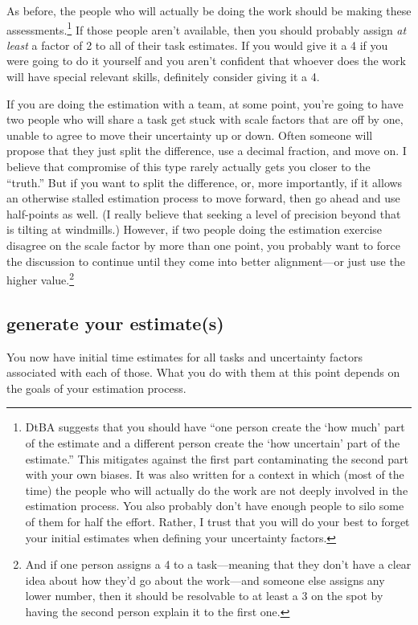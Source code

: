 \documentclass[12pt,oneside]{book}
\begin{document}
As before, the people who will actually be doing the work should be making these assessments.\footnote{
DtBA suggests that you should have ``one person create the `how much' part of the estimate and a different person create the `how uncertain' part of the estimate.'' This mitigates against the first part contaminating the second part with your own biases. It was also written for a context in which (most of the time) the people who will actually do the work are not deeply involved in the estimation process. You also probably don't have enough people to silo some of them for half the effort. Rather, I trust that you will do your best to forget your initial estimates when defining your uncertainty factors.}
If those people aren't available, then you should probably assign \emph{at least} a factor of 2 to all of their task estimates. If you would give it a 4 if you were going to do it yourself and you aren't confident that whoever does the work will have special relevant skills, definitely consider giving it a 4.

If you are doing the estimation with a team, at some point, you're going to have two people who will share a task get stuck with scale factors that are off by one, unable to agree to move their uncertainty up or down. Often someone will propose that they just split the difference, use a decimal fraction, and move on. I believe that compromise of this type rarely actually gets you closer to the ``truth.'' But if you want to split the difference, or, more importantly, if it allows an otherwise stalled estimation process to move forward, then go ahead and use half-points as well. (I really believe that seeking a level of precision beyond that is tilting at windmills.) However, if two people doing the estimation exercise disagree on the scale factor by more than one point, you probably want to force the discussion to continue until they come into better alignment---or just use the higher value.\footnote{
And if one person assigns a 4 to a task---meaning that they don't have a clear idea about how they'd go about the work---and someone else assigns any lower number, then it should be resolvable to at least a 3 on the spot by having the second person explain it to the first one.}

\subsection*{generate your estimate(s)}

You now have initial time estimates for all tasks and uncertainty factors associated with each of those. What you do with them at this point depends on the goals of your estimation process.
\end{document}
